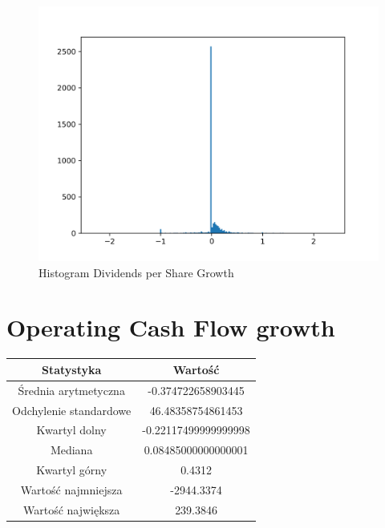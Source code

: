 \documentclass{article}
\begin{document}
\begin{figure}[h!]
    \includegraphics[width=\linewidth]{variables/Dividends per Share Growth.png}
    \caption{Histogram Dividends per Share Growth }
\end{figure}\section{ Operating Cash Flow growth }

\begin{center}
    \begin{tabular}{|c | c|} 
    \hline
    Statystyka & Wartość \\
    \hline\hline
    Średnia arytmetyczna & -0.374722658903445 \\ 
    \hline
    Odchylenie standardowe & 46.48358754861453 \\
    \hline
    Kwartyl dolny & -0.22117499999999998 \\
    \hline
    Mediana & 0.08485000000000001 \\
    \hline
    Kwartyl górny & 0.4312 \\
    \hline
    Wartość najmniejsza & -2944.3374 \\
    \hline
    Wartość największa & 239.3846 \\
    \hline
   \end{tabular}
\end{center}
\end{document}
